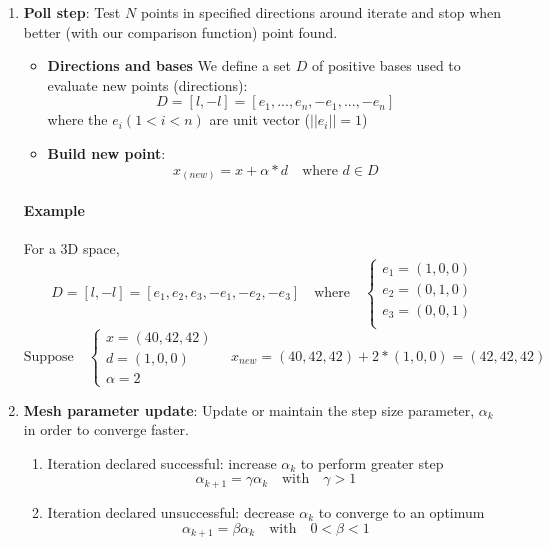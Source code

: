 \begin{enumerate}
    \item \textbf{Poll step}: Test $N$ points in specified directions
        around iterate and stop when better (with our comparison
        function) point found.

        \begin{itemize}

            \item \textbf{Directions and bases}
                We define a set $D$ of positive bases used to evaluate new
                points (directions):
                $$D = [l, -l] = [e_1,..., e_n, -e_1,..., -e_n]$$
                where the $e_i (1 < i < n)$ are unit vector ($||e_i|| = 1$)

            \item \textbf{Build new point}: 
                $$x_(new) = x+\alpha*d \quad \textrm{where } d \in D$$
        \end{itemize}

        \paragraph{Example} For a 3D space,
        $$D = [l, -l] = [e_1, e_2, e_3, -e_1, -e_2, -e_3] \quad
        \textrm{where} \quad \begin{cases}
            e_1 = (1,0,0) \\
            e_2 = (0,1,0)\\
            e_3 = (0,0,1)\\
        \end{cases} $$
        $$\textrm{Suppose} \quad \begin{cases} 
            x = (40, 42, 42)\\
            d = (1, 0, 0)\\
            \alpha =2
        \end{cases} \quad           
        x_{new}  = (40, 42, 42) + 2 * (1, 0, 0) = (42, 42, 42)$$


    \item \textbf{Mesh parameter update}: Update or maintain the step
        size parameter, $\alpha_k$ in order to converge faster.

        \begin{enumerate}
            \item Iteration declared successful: increase $\alpha_k$ to
                perform greater step
                $$\alpha_{k+1} = \gamma \alpha_k \quad \textrm{with}\quad \gamma > 1$$

            \item Iteration declared unsuccessful: decrease $\alpha_k$ to
                converge to an optimum
                $$\alpha_{k+1} = \beta \alpha_k \quad \textrm{with}\quad
                0 < \beta < 1$$
            \end{enumerate}
\end{enumerate}

